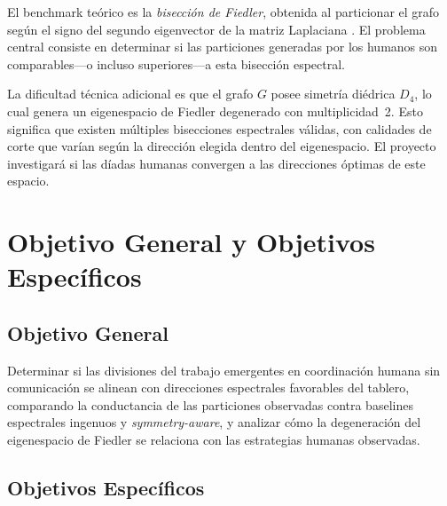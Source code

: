 \documentclass[conference]{IEEEtran}
\begin{document}
El benchmark teórico es la \textit{bisección de Fiedler}, obtenida al particionar el grafo según el signo del segundo eigenvector de la matriz Laplaciana \cite{fiedler1973, vonluxburg2007}. El problema central consiste en determinar si las particiones generadas por los humanos son comparables---o incluso superiores---a esta bisección espectral.

La dificultad técnica adicional es que el grafo $G$ posee simetría diédrica $D_4$, lo cual genera un eigenespacio de Fiedler degenerado con multiplicidad~2. Esto significa que existen múltiples bisecciones espectrales válidas, con calidades de corte que varían según la dirección elegida dentro del eigenespacio. El proyecto investigará si las díadas humanas convergen a las direcciones óptimas de este espacio.

\section{Objetivo General y Objetivos Específicos}

\subsection{Objetivo General}

Determinar si las divisiones del trabajo emergentes en coordinación humana sin comunicación se alinean con direcciones espectrales favorables del tablero, comparando la conductancia de las particiones observadas contra baselines espectrales ingenuos y \textit{symmetry-aware}, y analizar cómo la degeneración del eigenespacio de Fiedler se relaciona con las estrategias humanas observadas.

\subsection{Objetivos Específicos}
\end{document}
